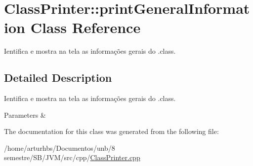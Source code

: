 \hypertarget{classClassPrinter_1_1printGeneralInformation}{}\section{Class\+Printer\+:\+:print\+General\+Information Class Reference}
\label{classClassPrinter_1_1printGeneralInformation}


Ientifica e mostra na tela as informações gerais do .class.  




\subsection{Detailed Description}
Ientifica e mostra na tela as informações gerais do .class. 


\begin{DoxyParams}{Parameters}
{\em } & \\
\hline
\end{DoxyParams}


The documentation for this class was generated from the following file\+:\begin{DoxyCompactItemize}
\item 
/home/arturhbs/\+Documentos/unb/8 semestre/\+S\+B/\+J\+V\+M/src/cpp/\hyperlink{ClassPrinter_8cpp}{Class\+Printer.\+cpp}\end{DoxyCompactItemize}
